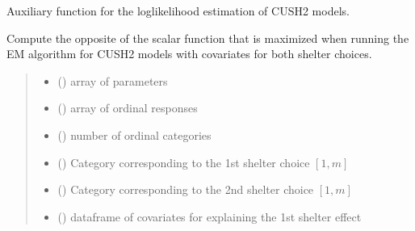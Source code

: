 \documentclass[letterpaper,10pt,english]{sphinxmanual}
\begin{document}
\begin{fulllineitems}
\label{\detokenize{cubmods:cubmods.cush2_xx.effe}}
\pysigstartsignatures
{}
\pysigstopsignatures
\sphinxAtStartPar
Auxiliary function for the log\sphinxhyphen{}likelihood estimation of CUSH2 models.

\sphinxAtStartPar
Compute the opposite of the scalar function that is maximized when running
the E\sphinxhyphen{}M algorithm for CUSH2 models with covariates for both shelter choices.
\begin{quote}\begin{description}
\begin{itemize}
\item {} 
\sphinxAtStartPar
{} () \textendash{} array of parameters

\item {} 
\sphinxAtStartPar
{} () \textendash{} array of ordinal responses

\item {} 
\sphinxAtStartPar
{} () \textendash{} number of ordinal categories

\item {} 
\sphinxAtStartPar
{} () \textendash{} Category corresponding to the 1st shelter choice \([1,m]\)

\item {} 
\sphinxAtStartPar
{} () \textendash{} Category corresponding to the 2nd shelter choice \([1,m]\)

\item {} 
\sphinxAtStartPar
{} () \textendash{} dataframe of covariates for explaining the 1st shelter effect


\end{itemize}
\end{description}
\end{quote}
\end{fulllineitems}
\end{document}
